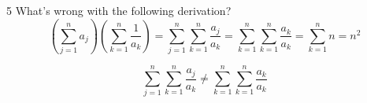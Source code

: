 \documentclass[a4paper,12pt]{article}
\makeatletter
\newtheorem*{solution}{Solution}
\theoremstyle{definition}
\renewenvironment{solution}[1][Solution] {\par\pushQED{\qed}\normalfont\topsep6\p@\@plus6\p@\relax\trivlist\item[\hskip\labelsep\bfseries#1\@addpunct{.}]\ignorespaces}{\popQED\endtrivlist\@endpefalse} \makeatother
\newenvironment{problems}{\begin{list}{}{\renewcommand{\makelabel}[1]{\textbf{##1}\hfil}}}{\end{list}}
\makeatother
\begin{document}
\begin{problems}
\begin{solution}
    \end{solution}
    \item[5] What's wrong with the following derivation?
    \begin{equation*}
        \left(\sum_{j=1}^n a_j\right)\left(\sum_{k=1}^n \frac{1}{a_k}\right) = \sum_{j=1}^n\sum_{k=1}^n\frac{a_j}{a_k} = \sum_{k=1}^n\sum_{k=1}^n \frac{a_k}{a_k} = \sum_{k=1}^n n = n^2
    \end{equation*}
    \begin{solution}
        \begin{equation*}
            \sum_{j=1}^n\sum_{k=1}^n\frac{a_j}{a_k} \neq \sum_{k=1}^n\sum_{k=1}^n \frac{a_k}{a_k}

\end{equation*}
\end{solution}
\end{problems}
\end{document}
